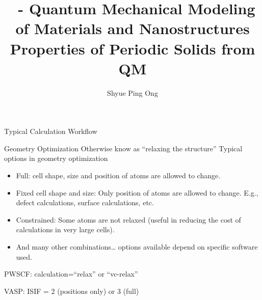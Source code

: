 \documentclass[aspectratio=169]{beamer}
\title[\classname Properties of Periodic Solids from QM]{\classname~- Quantum Mechanical Modeling of Materials and Nanostructures\\Properties of Periodic Solids from QM}
\author{Shyue Ping Ong}
\institute[UCSD]{University of California, San Diego\\
\medskip
}
\date{\classyear} %
\begin{document}
    \begin{frame}
        \titlepage %
    \end{frame}

    \begin{frame}{Typical Calculation Workflow}
        \begin{figure}
            \centering
        \end{figure}

    \end{frame}

    \begin{frame}{Geometry Optimization}
        Otherwise know as ``relaxing the structure''\newline
        \newline
        Typical options in geometry optimization
        \begin{itemize}
            \item Full: cell shape, size and position of atoms are allowed to change.
            \item Fixed cell shape and size: Only position of atoms are allowed to change. E.g., defect calculations, surface calculations, etc.
            \item Constrained: Some atoms are not relaxed (useful in reducing the cost of calculations in very large cells).
            \item And many other combinations… options available depend on specific software used.
        \end{itemize}

        PWSCF: calculation=``relax'' or ``vc-relax''

        VASP: ISIF = 2 (positions only) or 3 (full)

    \end{frame}
\end{document}
